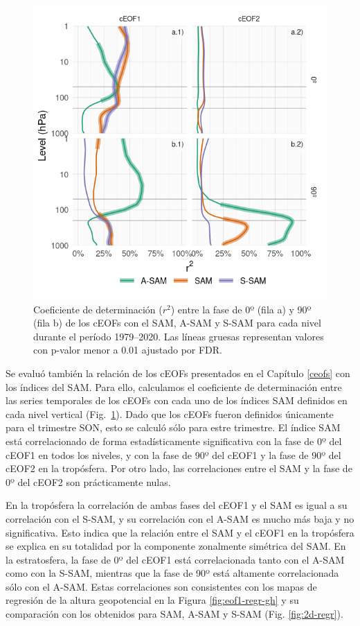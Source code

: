 \documentclass[12pt,oneside,a4paper]{reedthesis}
\begin{document}
\begin{figure}

{\centering \includegraphics{figures/30-sam/sam-eof-vertical-1} 

}

\caption{Coeficiente de determinación (\(r^2\)) entre la fase de 0º (fila a) y 90º (fila b) de los cEOFs con el SAM, A-SAM y S-SAM para cada nivel durante el período 1979--2020. Las líneas gruesas representan valores con p-valor menor a 0.01 ajustado por FDR.}\label{fig:sam-eof-vertical}
\end{figure}

Se evaluó también la relación de los cEOFs presentados en el Capítulo \ref{ceofs} con los índices del SAM.
Para ello, calculamos el coeficiente de determinación entre las series temporales de los cEOFs con cada uno de los índices SAM definidos en cada nivel vertical (Fig.~\ref{fig:sam-eof-vertical}).
Dado que los cEOFs fueron definidos únicamente para el trimestre SON, esto se calculó sólo para estre trimestre.
El índice SAM está correlacionado de forma estadísticamente significativa con la fase de 0º del cEOF1 en todos los niveles, y con la fase de 90º del cEOF1 y la fase de 90º del cEOF2 en la tropósfera.
Por otro lado, las correlaciones entre el SAM y la fase de 0º del cEOF2 son prácticamente nulas.

En la tropósfera la correlación de ambas fases del cEOF1 y el SAM es igual a su correlación con el S-SAM, y su correlación con el A-SAM es mucho más baja y no significativa.
Esto indica que la relación entre el SAM y el cEOF1 en la tropósfera se explica en su totalidad por la componente zonalmente simétrica del SAM.
En la estratosfera, la fase de 0º del cEOF1 está correlacionada tanto con el A-SAM como con la S-SAM, mientras que la fase de 90º está altamente correlacionada sólo con el A-SAM.
Estas correlaciones son consistentes con los mapas de regresión de la altura geopotencial en la Figura \ref{fig:eof1-regr-gh} y su comparación con los obtenidos para SAM, A-SAM y S-SAM (Fig. \ref{fig:2d-regr}).
\end{document}
